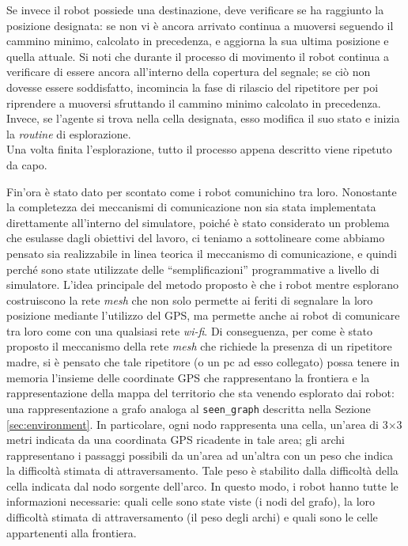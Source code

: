 Se invece il robot possiede una destinazione, deve verificare se ha raggiunto la posizione designata: se non vi è ancora arrivato continua a muoversi seguendo il cammino minimo, calcolato in precedenza, e aggiorna la sua ultima posizione e quella attuale.
Si noti che durante il processo di movimento il robot continua a verificare di essere ancora all'interno della copertura del segnale; se ciò non dovesse essere soddisfatto, incomincia la fase di rilascio del ripetitore per poi riprendere a muoversi sfruttando il cammino minimo calcolato in precedenza.
Invece, se l'agente si trova nella cella designata, esso modifica il suo stato e inizia la \textit{routine} di esplorazione.\\
Una volta finita l'esplorazione, tutto il processo appena descritto viene ripetuto da capo.

Fin'ora è stato dato per scontato come i robot comunichino tra loro.
Nonostante la completezza dei meccanismi di comunicazione non sia stata implementata direttamente all'interno del simulatore, poiché è stato considerato un problema che esulasse dagli obiettivi del lavoro, ci teniamo a sottolineare come abbiamo pensato sia realizzabile in linea teorica il meccanismo di comunicazione, e quindi perché sono state utilizzate delle “semplificazioni” programmative a livello di simulatore.
L'idea principale del metodo proposto è che i robot mentre esplorano costruiscono la rete \textit{mesh} che non solo permette ai feriti di segnalare la loro posizione mediante l'utilizzo del GPS, ma permette anche ai robot di comunicare tra loro come con una qualsiasi rete \textit{wi-fi}.
Di conseguenza, per come è stato proposto il meccanismo della rete \textit{mesh} \cite{yarali2009wireless} che richiede la presenza di un ripetitore madre, si è pensato che tale ripetitore (o un pc ad esso collegato) possa tenere in memoria l'insieme delle coordinate GPS che rappresentano la frontiera e la rappresentazione della mappa del territorio che sta venendo esplorato dai robot: una rappresentazione a grafo analoga al \texttt{seen\_graph} descritta nella Sezione \ref{sec:environment}.
In particolare, ogni nodo rappresenta una cella, un'area di 3$\times$3 metri indicata da una coordinata GPS ricadente in tale area; gli archi rappresentano i passaggi possibili da un'area ad un'altra con un peso che indica la difficoltà stimata di attraversamento. Tale peso è stabilito dalla difficoltà della cella indicata dal nodo sorgente dell'arco.
In questo modo, i robot hanno tutte le informazioni necessarie: quali celle sono state viste (i nodi del grafo), la loro difficoltà stimata di attraversamento (il peso degli archi) e quali sono le celle appartenenti alla frontiera.
